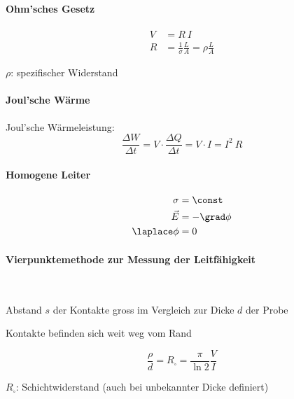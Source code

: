 		\paragraph{Ohm'sches Gesetz} %
			\begin{align*}
				V &= R\:I \\
				R &= \frac{1}{\sigma} \frac{L}{A} = \rho \frac{L}{A}
			\end{align*}
			\begin{tightitemize}
				\item[$\rho$:] spezifischer Widerstand \niceunit{\ohm\metre}
			\end{tightitemize}
		
		\paragraph{Joul'sche Wärme} %
			Joul'sche Wärmeleistung:
			\begin{equation*}
				\frac{\Delta W}{\Delta t} = V \cdot \frac{\Delta Q}{\Delta t} = V \cdot I = I^2 \:R
			\end{equation*}
		
		\paragraph{Homogene Leiter} %
			\begin{align*}
				\sigma &= \const \\
				\vec E &= -\grad\phi \\
				\laplace \phi &= 0
			\end{align*}
		
		\paragraph{Vierpunktemethode zur Messung der Leitfähigkeit} %
			~
			
			\begin{bedingungen}
				\item Abstand $s$ der Kontakte gross im Vergleich zur Dicke $d$ der Probe
				\item Kontakte befinden sich weit weg vom Rand
			\end{bedingungen}
			
			\begin{equation*}
				\frac{\rho}{d} = R_\square = \frac{\pi}{\ln 2} \frac{V}{I}
			\end{equation*}
			\begin{tightitemize}
				\item[$R_\square$:] Schichtwiderstand \niceunit{\ohm} (auch bei unbekannter Dicke definiert)
			\end{tightitemize}
